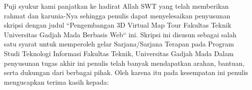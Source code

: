 \vspace{7cm}

\begin{center}
	Puji syukur kami panjatkan ke hadirat Allah SWT yang telah memberikan rahmat dan karunia-Nya sehingga penulis dapat menyelesaikan penyusunan skripsi dengan judul “Pengembangan 3D Virtual Map Tour Fakultas Teknik Universitas Gadjah Mada Berbasis Web“ ini. Skripsi ini disusun sebagai salah satu syarat untuk memperoleh gelar Sarjana/Sarjana Terapan pada Program Studi Teknologi Informasi Fakultas Teknik, Universitas Gadjah Mada Dalam penyusunan tugas akhir ini penulis telah banyak mendapatkan arahan, bantuan, serta dukungan dari berbagai pihak. Oleh karena itu pada kesempatan ini penulis mengucapkan terima kasih kepada:
\end{center}

